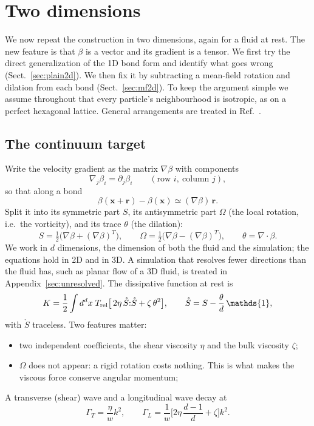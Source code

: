 \documentclass[11pt,aps,preprint,nofootinbib,superscriptaddress,tightenlines]{revtex4-2}
\def\st{\begin{equation}}
\def\stp{\end{equation}}
\def\Sect#1{Sect.~\ref{#1}}
\newcommand{\one}{\mathds{1}}
\begin{document}
\section{Two dimensions}
\label{sec:twod}

We now repeat the construction in two dimensions, again for a fluid at rest.
The new feature is that $\beta$ is a vector and its gradient is a tensor.  We
first try the direct generalization of the 1D bond form and identify what goes
wrong (\Sect{sec:plain2d}).  We then fix it by subtracting a mean-field rotation
and dilation from each bond (\Sect{sec:mf2d}).  To keep the argument simple we
assume throughout that every particle's neighbourhood is isotropic, as on a
perfect hexagonal lattice.  General arrangements are treated in
Ref.~\cite{ParticleMetrics}.

\subsection{The continuum target}

Write the velocity gradient as the matrix $\nabla\beta$ with components
\st
\nabla_j\beta_i=\partial_j\beta_i\qquad(\text{row }i,\ \text{column }j),
\stp
so that along a bond
\st
\beta(\bm x+\bm r)-\beta(\bm x)\simeq(\nabla\beta)\,\bm r .
\stp
Split it into its symmetric part $S$,
its antisymmetric part $\Omega$ (the local rotation, i.e.\ the vorticity), and
its trace $\theta$ (the dilation):
\st
S=\tfrac12\big(\nabla\beta+(\nabla\beta)^T\big),\qquad \Omega=\tfrac12\big(\nabla\beta-(\nabla\beta)^T\big),\qquad \theta=\nabla\!\cdot\!\beta .
\label{split}
\stp
We work in $d$ dimensions, the dimension of both the fluid and the
simulation; the equations hold in 2D and in 3D.  A simulation that resolves
fewer directions than the fluid has, such as planar flow of a 3D fluid, is
treated in Appendix~\ref{sec:unresolved}.
The dissipative function at rest is
\st
K=\frac12\int d^dx\;T_{\rm rel}\big[\,2\eta\,\mathring S{:}\mathring S+\zeta\,\theta^2\big],
\qquad \mathring S=S-\frac{\theta}{d}\,\one ,
\label{K2dcont}
\stp
with $\mathring S$ traceless.  Two features matter:
\begin{itemize}
\item two independent coefficients, the shear viscosity $\eta$ and the bulk
  viscosity $\zeta$;
\item $\Omega$ does not appear: a rigid rotation costs nothing.  This is what makes
  the viscous force conserve angular momentum;
\end{itemize}
A transverse (shear) wave and a longitudinal wave decay at
\st
\Gamma_T=\frac{\eta}{w}k^2,\qquad
\Gamma_L=\frac{1}{w}\Big[2\eta\,\frac{d-1}{d}+\zeta\Big]k^2 .
\label{Gphys2d}
\stp
\end{document}
